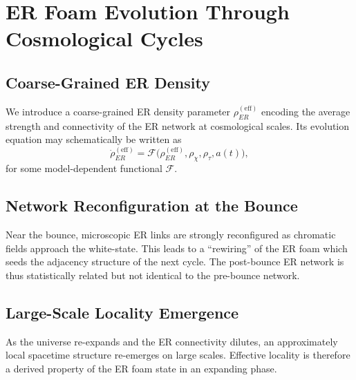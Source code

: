 \chapter{ER Foam Evolution Through Cosmological Cycles}

\section{Coarse-Grained ER Density}

We introduce a coarse-grained ER density parameter $\rho_{ER}^{\mathrm{(eff)}}$ encoding the average strength and connectivity of the ER network at cosmological scales.
Its evolution equation may schematically be written as
\[
  \dot{\rho}_{ER}^{\mathrm{(eff)}}
  =
  \mathcal{F}\big(\rho_{ER}^{\mathrm{(eff)}}, \rho_\chi, \rho_\tau, a(t)\big),
\]
for some model-dependent functional $\mathcal{F}$.

\section{Network Reconfiguration at the Bounce}

Near the bounce, microscopic ER links are strongly reconfigured as chromatic fields approach the white-state.
This leads to a ``rewiring'' of the ER foam which seeds the adjacency structure of the next cycle.
The post-bounce ER network is thus statistically related but not identical to the pre-bounce network.

\section{Large-Scale Locality Emergence}

As the universe re-expands and the ER connectivity dilutes, an approximately local spacetime structure re-emerges on large scales.
Effective locality is therefore a derived property of the ER foam state in an expanding phase.

